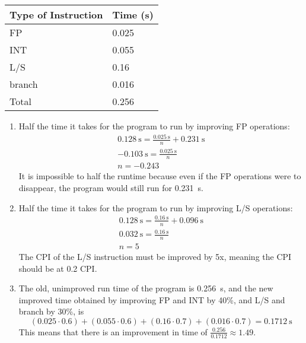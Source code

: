 \documentclass{article}
\begin{document}
\begin{table}[H]
    \centering
    \begin{tabular}{l|l}
        Type of Instruction & Time (s) \\ \hline
        FP & 0.025 \\
        INT & 0.055 \\
        L/S & 0.16 \\
        branch & 0.016 \\
        Total & 0.256
    \end{tabular}
\end{table}

\begin{enumerate}
    \item Half the time it takes for the program to run by improving FP operations:
    \begin{gather*}
        \SI{0.128}{\second} = \frac{\SI{0.025}{\second}}{n} + \SI{0.231}{\second}\\
        -\SI{0.103}{\second} = \frac{\SI{0.025}{\second}}{n}\\
        n = -0.243
    \end{gather*}
    It is impossible to half the runtime because even if the
    FP operations were to disappear, the program would still
    run for \SI{0.231}{\second}.
    \item Half the time it takes for the program to run by improving L/S operations:
    \begin{gather*}
        \SI{0.128}{\second} = \frac{\SI{0.16}{\second}}{n} + \SI{0.096}{\second}\\
        \SI{0.032}{\second} = \frac{\SI{0.16}{\second}}{n}\\
        n = 5
    \end{gather*}
    The CPI of the L/S instruction must be improved by 5x,
    meaning the CPI should be at 0.2 CPI.
    \item The old, unimproved run time of the program is \SI{0.256}{\second},
    and the new improved time obtained by improving FP and INT by
    40\%, and L/S and branch by 30\%, is
    \begin{equation*}
        \left(0.025\cdot0.6\right)+\left(0.055\cdot0.6\right)+\left(0.16\cdot0.7\right)+\left(0.016\cdot0.7\right)=\SI{0.1712}{\second}
    \end{equation*}
    This means that there is an improvement in time of
    \(\frac{0.256}{0.1712}\approx 1.49\).
\end{enumerate}
\end{document}
